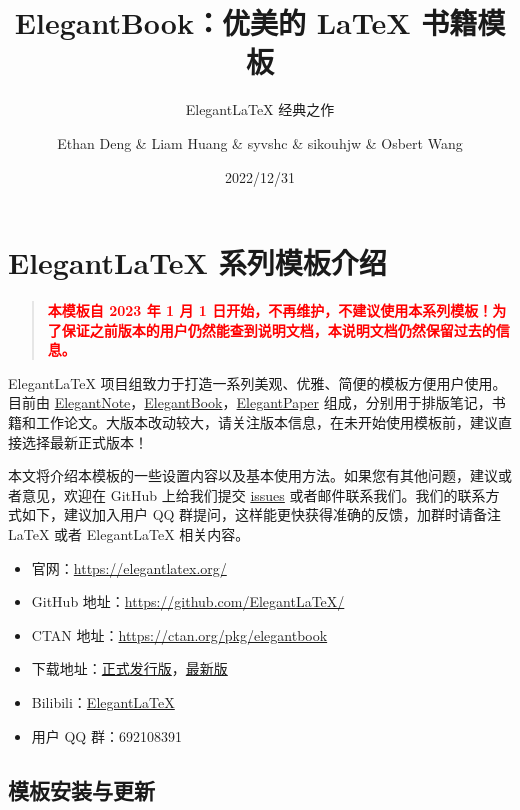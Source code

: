 \documentclass[lang=cn,newtx,10pt,scheme=chinese]{elegantbook}
\title{ElegantBook：优美的 \LaTeX{} 书籍模板}
\subtitle{Elegant\LaTeX{} 经典之作}
\author{Ethan Deng \& Liam Huang \& syvshc \& sikouhjw \& Osbert Wang}
\institute{Elegant\LaTeX{} Program}
\date{2022/12/31}
\begin{document}
\maketitle
\frontmatter


\mainmatter

\chapter{Elegant\LaTeX{} 系列模板介绍}

\begin{quotation}
  \textbf{\textcolor{red}{本模板自 2023 年 1 月 1 日开始，不再维护，不建议使用本系列模板！为了保证之前版本的用户仍然能查到说明文档，本说明文档仍然保留过去的信息。}}
\end{quotation}

Elegant\LaTeX{} 项目组致力于打造一系列美观、优雅、简便的模板方便用户使用。目前由 \href{https://github.com/ElegantLaTeX/ElegantNote}{ElegantNote}，\href{https://github.com/ElegantLaTeX/ElegantBook}{ElegantBook}，\href{https://github.com/ElegantLaTeX/ElegantPaper}{ElegantPaper} 组成，分别用于排版笔记，书籍和工作论文。大版本改动较大，请关注版本信息，在未开始使用模板前，建议直接选择最新正式版本！


本文将介绍本模板的一些设置内容以及基本使用方法。如果您有其他问题，建议或者意见，欢迎在 GitHub 上给我们提交 \href{https://github.com/ElegantLaTeX/ElegantBook/issues}{issues} 或者邮件联系我们。我们的联系方式如下，建议加入用户 QQ 群提问，这样能更快获得准确的反馈，加群时请备注 \LaTeX{} 或者 Elegant\LaTeX{} 相关内容。
\begin{itemize}
  \item 官网：\href{https://elegantlatex.org/}{https://elegantlatex.org/}
  \item GitHub 地址：\href{https://github.com/ElegantLaTeX/}{https://github.com/ElegantLaTeX/}
  \item CTAN 地址：\href{https://ctan.org/pkg/elegantbook}{https://ctan.org/pkg/elegantbook}
  \item 下载地址：\href{https://github.com/ElegantLaTeX/ElegantBook/releases}{正式发行版}，\href{https://github.com/ElegantLaTeX/ElegantBook/archive/master.zip}{最新版}
  \item Bilibili：\href{https://space.bilibili.com/516479629}{ElegantLaTeX}
  \item 用户 QQ 群：692108391
\end{itemize}


\section{模板安装与更新}
\end{document}
